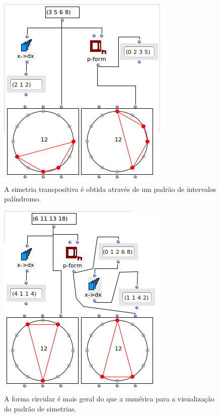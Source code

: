 \documentclass[
	12pt,				%
	openright,			%
	twoside,			%
	a4paper,			%
	english,			%
	french,				%
	spanish,			%
	brazil				%
	]{abntex2}
\begin{document}
\begin{figure}[!h]
	\caption{\label{fig_grafico}A simetria transpositiva é obtida através de um padrão de intervalos palíndromo. }
	\begin{center}
	    \includegraphics[scale=0.6]{OM_settheory/palindrome1.png}
	\end{center}
\end{figure}



\begin{figure}[!h]
	\caption{\label{fig_grafico}A forma circular é mais geral do que a numérica para a visualização do padrão de simetrias. }
	\begin{center}
	    \includegraphics[scale=0.6]{OM_settheory/palindrome2.png}
	\end{center}
\end{figure}
\end{document}
